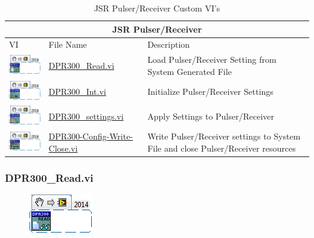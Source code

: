 \documentclass[11pt,a4paper,oldfontcommands]{memoir}
\begin{document}
\begin{table}[H]
	\centering
	\begin{tabular}{ m{2.5cm} | m{5cm} | m{5cm} }
		\hline
		\hline \multicolumn{3}{c}{JSR Pulser/Receiver} \\ \hline \hline
		VI & File Name & Description \\ \hline
		\includegraphics[scale=0.625]{DPR300_Read_main} & \hyperref[DPR300_Read]{DPR300\_Read.vi} & Load Pulser/Receiver Setting from System Generated File \\ \hline
		\includegraphics[scale=0.625]{DPR300_Int_main_02} & \hyperref[DPR300_Int]{DPR300\_Int.vi} & Initialize Pulser/Receiver Settings \\ \hline
		\includegraphics[scale=0.625]{DPR300_settings_main_01} & \hyperref[DPR300_settings]{DPR300\_settings.vi} & Apply Settings to Pulser/Receiver \\ \hline
		\includegraphics[scale=0.625]{DPR300-Config-Write-Close_main_01} & \hyperref[DPR300_cwc]{DPR300-Config-Write-Close.vi} & Write Pulser/Receiver settings to System File and close Pulser/Receiver resources \\ \hline
	\end{tabular}
	\caption{JSR Pulser/Receiver Custom VI's}
	\label{tab:jsr}
\end{table}

\subsubsection{DPR300\_Read.vi} \label{DPR300_Read}
\noindent\hrulefill

\begin{figure}[h]
	\includegraphics[scale=0.625]{DPR300_Read_main}
	\label{fig:DPR300_Read_main}
\end{figure}
\end{document}
